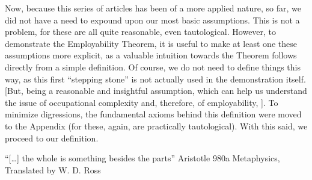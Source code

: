 \documentclass[hidelinks, nonatbib]{elsarticle}
\begin{document}

Now, because this series of articles has been of a more applied nature, so far, we did not have a need to expound upon our most basic assumptions. This is not a problem, for these are all quite reasonable, even tautological. However, to demonstrate the Employability Theorem, it is useful to make at least one these assumptions more explicit, as a valuable intuition towards the Theorem follows directly from a simple definition. Of course, we do not need to define things this way, as this first ``stepping stone'' is not actually used in the demonstration itself. [But, being a reasonable and insightful assumption, which can help us understand the issue of occupational complexity and, therefore, of employability, ]. To minimize digressions, the fundamental axioms behind this definition were moved to the Appendix (for these, again, are practically tautological). With this said, we proceed to our definition.

\SklTasks
\SklDifficulty
\SSL
\ComplexTask
\SCL
\ORA
\OCA
``[\dots] the whole is something besides the parts''
Aristotle 980a Metaphysics, Translated by W. D. Ross 
\end{document}
